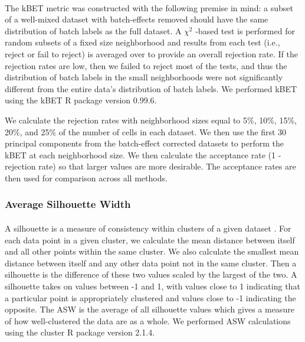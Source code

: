 \documentclass[
12pt, %
letterpaper, %
oneside, %
headinclude,footinclude, %
BCOR5mm, %
]{scrartcl}
\begin{document}
\paragraph*{}
The kBET metric \citep{buttner2019test} was constructed with the following premise in mind: a subset of a well-mixed dataset with batch-effects removed should have the same distribution of batch labels as the full dataset. A $\chi^2$ -based test is performed for random subsets of a fixed size neighborhood and results from each test (i.e., reject or fail to reject) is averaged over to provide an overall rejection rate. If the rejection rates are low, then we failed to reject most of the tests, and thus the distribution of batch labels in the small neighborhoods were not significantly different from the entire data's distribution of batch labels. We performed kBET using the kBET R package \citep{buttner2017kbet} version 0.99.6.

We calculate the rejection rates with neighborhood sizes equal to 5\%, 10\%, 15\%, 20\%, and 25\% of the number of cells in each dataset. We then use the first 30 principal components from the batch-effect corrected datasets to perform the kBET at each neighborhood size. We then calculate the acceptance rate (1 - rejection rate) so that larger values are more desirable. The acceptance rates are then used for comparison across all methods.

\subsubsection*{Average Silhouette Width}

\paragraph*{}
A silhouette is a measure of consistency within clusters of a given dataset \citep{rousseeuw1987silhouettes}. For each data point in a given cluster, we calculate the mean distance between itself and all other points within the same cluster. We also calculate the smallest mean distance between itself and any other data point not in the same cluster. Then a silhouette is the difference of these two values scaled by the largest of the two. A silhouette takes on values between -1 and 1, with values close to 1 indicating that a particular point is appropriately clustered and values close to -1 indicating the opposite. The ASW is the average of all silhouette values which gives a measure of how well-clustered the data are as a whole. We performed ASW calculations using the cluster R package \citep{maechler2022cluster} version 2.1.4.
\end{document}
